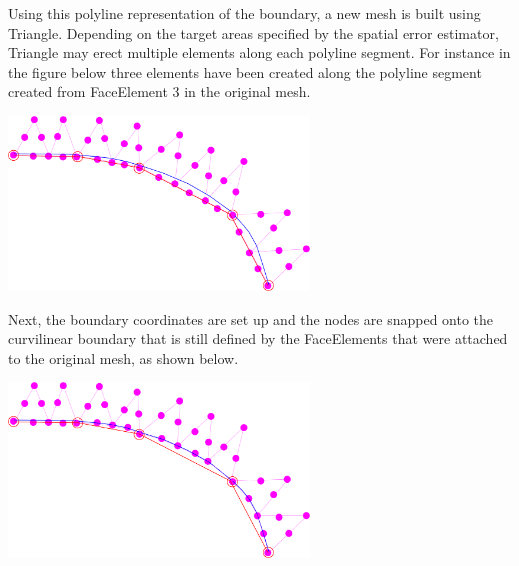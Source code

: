 Using this polyline representation of the boundary, a new mesh is built using {\ttfamily Triangle}. Depending on the target areas specified by the spatial error estimator, {\ttfamily Triangle} may erect multiple elements along each polyline segment. For instance in the figure below three elements have been created along the polyline segment created from {\ttfamily Face\+Element} 3 in the original mesh.

 
\begin{DoxyImage}
\includegraphics[width=0.6\textwidth]{remesh_2}
\end{DoxyImage}


Next, the boundary coordinates are set up and the nodes are snapped onto the curvilinear boundary that is still defined by the {\ttfamily Face\+Elements} that were attached to the original mesh, as shown below.

 
\begin{DoxyImage}
\includegraphics[width=0.6\textwidth]{remesh_3}
\end{DoxyImage}


